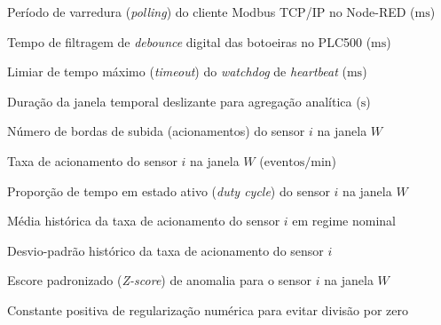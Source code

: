 
\begin{simbolos}
  \item[$T_p$] Período de varredura (\textit{polling}) do cliente Modbus TCP/IP no Node-RED ($\text{ms}$)
  \item[$T_{db}$] Tempo de filtragem de \textit{debounce} digital das botoeiras no PLC500 ($\text{ms}$)
  \item[$T_{wd}$] Limiar de tempo máximo (\textit{timeout}) do \textit{watchdog} de \textit{heartbeat} ($\text{ms}$)
  \item[$W$] Duração da janela temporal deslizante para agregação analítica ($\text{s}$)
  \item[$N_i(W)$] Número de bordas de subida (acionamentos) do sensor $i$ na janela $W$
  \item[$\lambda_i(W)$] Taxa de acionamento do sensor $i$ na janela $W$ ($\text{eventos/min}$)
  \item[$D_i(W)$] Proporção de tempo em estado ativo (\textit{duty cycle}) do sensor $i$ na janela $W$
  \item[$\mu_i$] Média histórica da taxa de acionamento do sensor $i$ em regime nominal
  \item[$\sigma_i$] Desvio-padrão histórico da taxa de acionamento do sensor $i$
  \item[$z_i(W)$] Escore padronizado (\textit{Z-score}) de anomalia para o sensor $i$ na janela $W$
  \item[$\epsilon$] Constante positiva de regularização numérica para evitar divisão por zero
\end{simbolos}
